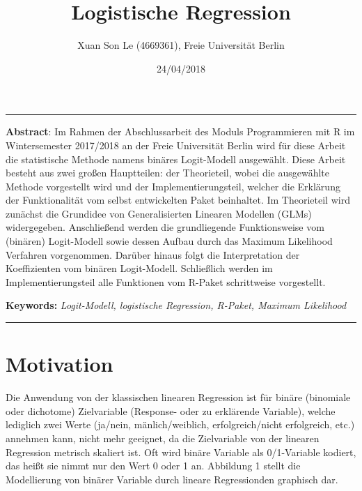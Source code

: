 \documentclass[12pt,]{article}
\title{\textbf{Logistische Regression}}
\author{Xuan Son Le (4669361), Freie Universität Berlin}
\date{24/04/2018}
\begin{document}
\maketitle

\begin{center}\rule{0.5\linewidth}{\linethickness}\end{center}

\textbf{Abstract}: Im Rahmen der Abschlussarbeit des Moduls
Programmieren mit R im Wintersemester 2017/2018 an der Freie Universität
Berlin wird für diese Arbeit die statistische Methode namens binäres
Logit-Modell ausgewählt. Diese Arbeit besteht aus zwei großen
Hauptteilen: der Theorieteil, wobei die ausgewählte Methode vorgestellt
wird und der Implementierungsteil, welcher die Erklärung der
Funktionalität vom selbst entwickelten Paket beinhaltet. Im Theorieteil
wird zunächst die Grundidee von Generalisierten Linearen Modellen (GLMs)
widergegeben. Anschließend werden die grundliegende Funktionsweise vom
(binären) Logit-Modell sowie dessen Aufbau durch das Maximum Likelihood
Verfahren vorgenommen. Darüber hinaus folgt die Interpretation der
Koeffizienten vom binären Logit-Modell. Schließlich werden im
Implementierungsteil alle Funktionen vom R-Paket schrittweise
vorgestellt.

\textbf{Keywords:} \emph{Logit-Modell, logistische Regression, R-Paket,
Maximum Likelihood}

\begin{center}\rule{0.5\linewidth}{\linethickness}\end{center}

\newpage

\section{Motivation}\label{motivation}

Die Anwendung von der klassischen linearen Regression ist für binäre
(binomiale oder dichotome) Zielvariable (Response- oder zu erklärende
Variable), welche lediglich zwei Werte (ja/nein, mänlich/weiblich,
erfolgreich/nicht erfolgreich, etc.) annehmen kann, nicht mehr geeignet,
da die Zielvariable von der linearen Regression metrisch skaliert ist.
Oft wird binäre Variable als 0/1-Variable kodiert, das heißt sie nimmt
nur den Wert 0 oder 1 an. Abbildung 1 stellt die Modellierung von
binärer Variable durch lineare Regressionden graphisch dar.
\end{document}

